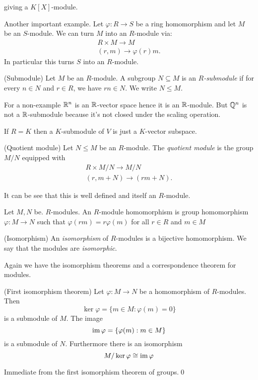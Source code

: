 \documentclass{article}
\begin{document}
giving a $ K[X] $-module.\par
Another important example. Let $ \varphi:R\to S $ be a ring homomorphism and let $ M $ be an $ S $-module. We can turn $ M $ into an $ R $-module via:
\begin{align*}
  R\times M\to M\\
  (r,m)\to \varphi(r)m.
\end{align*}
In particular this turns $ S $ into an $ R $-module.
\begin{definition}
	(Submodule) Let $ M $ be an $ R $-module. A subgroup $ N\subseteq M $ is an $ R $\textit{-submodule} if for every $ n\in N $ and $ r\in R $, we have $ rn\in N $. We write $ N\le M $.
\end{definition}
For a non-example $ \mathbb{R}^n $ is an $ \mathbb{R} $-vector space hence it is an $ \mathbb{R} $-module. But $ \mathbb{Q}^n $ is not a $ \mathbb{R} $-submodule because it's not closed under the scaling operation.\par
If $ R=K $ then a $ K $-submodule of $ V $ is just a $ K $-vector subspace.

\begin{definition}
	(Quotient module) Let $ N\le M $ be an $ R $-module. The \textit{quotient module} is the group $ M/N $ equipped with
	\begin{align*}
	  R\times M/N\to M/N \\
	  (r,m+N)\to (rm+N).
	\end{align*}
\end{definition}
It can be see that this is well defined and itself an $ R $-module.

\begin{definition}
  Let $ M,N $ be. $ R $-modules. An $ R $-module homomorphism is group homomorphism $ \varphi: M\to N $ such that $ \varphi(rm)=r\varphi(m) $ for all $ r\in R $ and $ m \in M$
\end{definition}
\begin{definition}
	(Isomorphism) An \textit{isomorphism} of $ R $-modules is a bijective homomorphism. We say that the modules are \textit{isomorphic}.
\end{definition}
Again we have the isomorphism theorems and a correspondence theorem for modules.
\begin{theorem}
	(First isomorphism theorem) Let $ \varphi: M\to N$ be a homomorphism of $ R $-modules. Then
	\[
		\ker\varphi=\{m\in M:\varphi(m)=0\}
	\]
	is a submodule of $ M $. The image
	\[
		\operatorname{im}\varphi= \{\varphi(m):m\in M\}
	\]
	is a submodule of $ N $. Furthermore there is an isomorphism
	\[
	  M/\ker\varphi\cong\operatorname{im}\varphi
	\]
\end{theorem}
\pf Immediate from the first isomorphism theorem of groups.\qed
\end{document}
